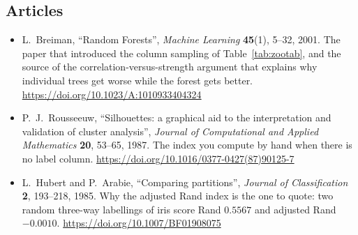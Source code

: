 \documentclass[11pt]{article}
\begin{document}
\subsection*{Articles}

\begin{itemize}[leftmargin=*]
  \item L.\ Breiman, ``Random Forests'', \emph{Machine Learning}
    \textbf{45}(1), 5--32, 2001. The paper that introduced the column
    sampling of Table~\ref{tab:zootab}, and the source of the
    correlation-versus-strength argument that explains why individual trees
    get worse while the forest gets better.
    \url{https://doi.org/10.1023/A:1010933404324}
  \item P.\ J.\ Rousseeuw, ``Silhouettes: a graphical aid to the
    interpretation and validation of cluster analysis'', \emph{Journal of
    Computational and Applied Mathematics} \textbf{20}, 53--65, 1987. The
    index you compute by hand when there is no label column.
    \url{https://doi.org/10.1016/0377-0427(87)90125-7}
  \item L.\ Hubert and P.\ Arabie, ``Comparing partitions'', \emph{Journal of
    Classification} \textbf{2}, 193--218, 1985. Why the adjusted Rand index
    is the one to quote: two random three-way labellings of iris score Rand
    $0.5567$ and adjusted Rand $-0.0010$.
    \url{https://doi.org/10.1007/BF01908075}
\end{itemize}

\notesources{\AMLPrescribed}
\end{document}
